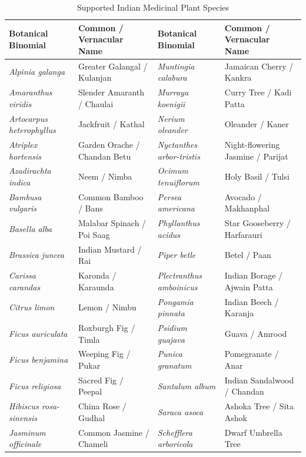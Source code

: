 \begin{table}[htbp]
\centering
\scriptsize
\setlength{\tabcolsep}{3pt}
\caption{Supported Indian Medicinal Plant Species}
\label{tab:plants_40}
\begin{tabular}{@{}llll@{}}
\hline
\textbf{Botanical Binomial} & \textbf{Common / Vernacular Name} & \textbf{Botanical Binomial} & \textbf{Common / Vernacular Name} \\
\hline
\textit{Alpinia galanga} & Greater Galangal / Kulanjan & \textit{Muntingia calabura} & Jamaican Cherry / Kankra \\
\textit{Amaranthus viridis} & Slender Amaranth / Chaulai & \textit{Murraya koenigii} & Curry Tree / Kadi Patta \\
\textit{Artocarpus heterophyllus} & Jackfruit / Kathal & \textit{Nerium oleander} & Oleander / Kaner \\
\textit{Atriplex hortensis} & Garden Orache / Chandan Betu & \textit{Nyctanthes arbor-tristis} & Night-flowering Jasmine / Parijat \\
\textit{Azadirachta indica} & Neem / Nimba & \textit{Ocimum tenuiflorum} & Holy Basil / Tulsi \\
\textit{Bambusa vulgaris} & Common Bamboo / Bans & \textit{Persea americana} & Avocado / Makhanphal \\
\textit{Basella alba} & Malabar Spinach / Poi Saag & \textit{Phyllanthus acidus} & Star Gooseberry / Harfarauri \\
\textit{Brassica juncea} & Indian Mustard / Rai & \textit{Piper betle} & Betel / Paan \\
\textit{Carissa carandas} & Karonda / Karaunda & \textit{Plectranthus amboinicus} & Indian Borage / Ajwain Patta \\
\textit{Citrus limon} & Lemon / Nimbu & \textit{Pongamia pinnata} & Indian Beech / Karanja \\
\textit{Ficus auriculata} & Roxburgh Fig / Timla & \textit{Psidium guajava} & Guava / Amrood \\
\textit{Ficus benjamina} & Weeping Fig / Pukar & \textit{Punica granatum} & Pomegranate / Anar \\
\textit{Ficus religiosa} & Sacred Fig / Peepal & \textit{Santalum album} & Indian Sandalwood / Chandan \\
\textit{Hibiscus rosa-sinensis} & China Rose / Gudhal & \textit{Saraca asoca} & Ashoka Tree / Sita Ashok \\
\textit{Jasminum officinale} & Common Jasmine / Chameli & \textit{Schefflera arboricola} & Dwarf Umbrella Tree \\

\end{tabular}
\end{table}
